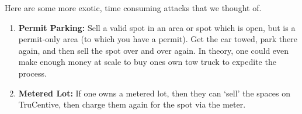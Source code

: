 \documentclass[a4paper]{article}
\begin{document}
Here are some more exotic, time consuming attacks that we thought of.
\begin{enumerate}
    \item \textbf{Permit Parking:} Sell a valid spot in an area or spot which is
    open, but is a permit-only area (to which you have a permit). Get the car
    towed, park there again, and then sell the spot over and over again. In
    theory, one could even make enough money at scale to buy ones own tow truck
    to expedite the process.
    \item \textbf{Metered Lot:} If one owns a metered lot, then they can `sell'
    the spaces on TruCentive, then charge them again for the spot via the meter.
\end{enumerate}
\end{document}
